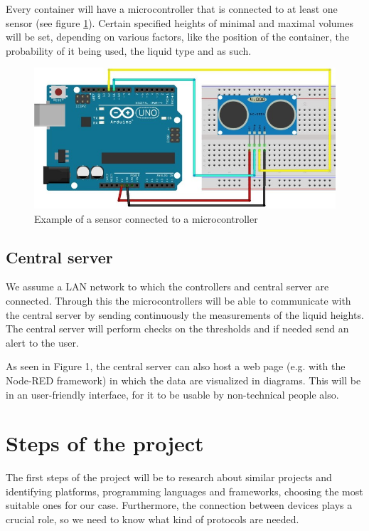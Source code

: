 \documentclass{article}
\begin{document}
Every container will have a microcontroller that is connected to at least one sensor (see figure \ref{sensorWithArduino}).
Certain specified heights of minimal and maximal volumes will be set, depending
on various factors, like the position of the container, the probability of it being used, 
the liquid type and as such.

\begin{figure}[h]
\includegraphics[scale=0.5]{sensorAndArduino.jpg}
\caption{Example of a sensor connected to a microcontroller}
\label{sensorWithArduino}
\end{figure}

\subsection{Central server}

We assume a LAN network to which the controllers and central
server are connected. Through this the microcontrollers will be able to communicate with the
central server by sending continuously the measurements of the liquid heights. 
The central server will perform checks on the thresholds and if needed send an alert to the user. 

As seen in Figure 1, the central server can also host a web page (e.g. with the Node-RED framework) in which the data are visualized in diagrams. 
This will be in an user-friendly interface, for it to be usable by non-technical people also.

\section{Steps of the project}

The first steps of the project will be to research about similar projects and
identifying platforms, programming languages and frameworks, choosing
the most suitable ones for our case.
Furthermore, the connection between devices
plays a crucial role, so we need to know what kind of protocols are needed.
\end{document}
